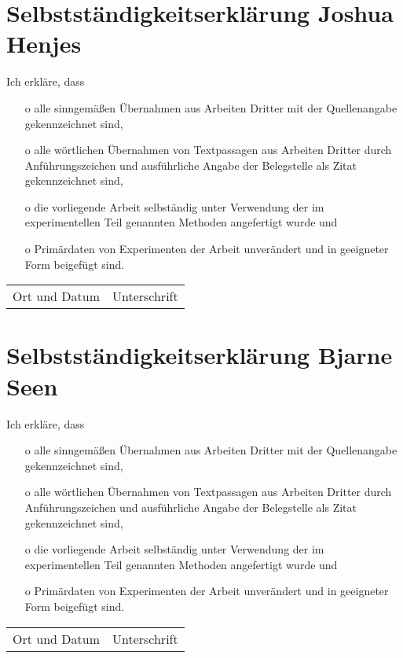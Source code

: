 \newpage
\appendix


\section{Selbstständigkeitserklärung Joshua Henjes}
Ich erkläre, dass
\begin{itemize}
    \item[o] alle sinngemäßen Übernahmen aus Arbeiten Dritter mit der Quellenangabe gekennzeichnet sind,
    \item[o] alle wörtlichen Übernahmen von Textpassagen aus Arbeiten Dritter durch Anführungszeichen und ausführliche Angabe der Belegstelle als Zitat gekennzeichnet sind,
    \item[o] die vorliegende Arbeit selbständig unter Verwendung der im experimentellen Teil genannten Methoden angefertigt wurde und
    \item[o] Primärdaten von Experimenten der Arbeit unverändert und in geeigneter Form beigefügt sind.
\end{itemize}
\vspace{0.5cm}
\begin{flushleft}
  \begin{table}[H]
      \begin{tabular}{l  l }
          \hline 
          Ort und Datum \hspace{3cm}  & Unterschrift \hspace*{5cm}
      \end{tabular}
  \end{table}
\end{flushleft}

\newpage

\section{Selbstständigkeitserklärung Bjarne Seen}
Ich erkläre, dass
\begin{itemize}
    \item[o] alle sinngemäßen Übernahmen aus Arbeiten Dritter mit der Quellenangabe gekennzeichnet sind,
    \item[o] alle wörtlichen Übernahmen von Textpassagen aus Arbeiten Dritter durch Anführungszeichen und ausführliche Angabe der Belegstelle als Zitat gekennzeichnet sind,
    \item[o] die vorliegende Arbeit selbständig unter Verwendung der im experimentellen Teil genannten Methoden angefertigt wurde und
    \item[o] Primärdaten von Experimenten der Arbeit unverändert und in geeigneter Form beigefügt sind.
\end{itemize}
\vspace{0.5cm}
\begin{flushleft}
  \begin{table}[H]
      \begin{tabular}{l  l }
          \hline 
          Ort und Datum \hspace{3cm}  & Unterschrift \hspace*{5cm}
      \end{tabular}
  \end{table}
\end{flushleft}